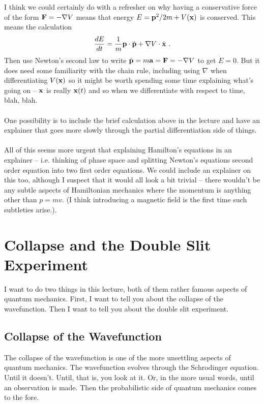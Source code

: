\documentclass[12pt]{article}
\def\be{\begin{eqnarray}}
\def\ee{\end{eqnarray}}
\newcommand\para{\paragraph{}}
\newcommand{\bx}{{\bf x}}
\begin{document}
{\color{blue}I think we could certainly do with a refresher on why having a conservative force of the form ${\bf F} = -\nabla V$ means that energy $E={\bf p}^2/2m + V(\bx)$ is conserved. This means the calculation 
%
\be \frac{dE}{dt} = \frac{1}{m} {\bf p}\cdot \dot{\bf p}+ \nabla V \cdot \dot{\bx}\ .\ee
%
Then use Newton's second law to write $\dot{\bf p} = m{\bf a} = {\bf F} = -\nabla V$ to get $\dot{E} = 0$. But it does need some familiarity with the chain rule, including using $\nabla$ when differentiating $V(\bx)$ so it might be worth spending some time explaining what's going on -- $\bx$ is really $\bx(t)$ and so when we differentiate with respect to time, blah, blah.

\para
One possibility is to include the brief calculation above in the lecture and have an explainer that goes more slowly through the partial differentiation side of things. 


\para
All of this seems more urgent that explaining Hamilton's equations  in an explainer -- i.e.  thinking of phase space and splitting Newton's equations second order equation into two first order equations. We could include an explainer on this too, although I suspect that it would all look a bit trivial -- there wouldn't be any subtle aspects of Hamiltonian mechanics where the momentum is anything other than $p=mv$. (I think introducing a magnetic field is the first time such subtleties arise.).}

\newpage
\section{Collapse and the Double Slit Experiment}

I want to do two things in this lecture, both of them rather famous aspects of quantum mechanics. First, I want to tell you about the collapse of the wavefunction. Then I want to tell you about the double slit experiment.


\subsection{Collapse of the Wavefunction}

The collapse of the wavefunction is one of the more unsettling aspects of quantum mechanics. The wavefunction evolves through the Schrodinger equation. Until it doesn't. Until, that is, you look at it. Or, in the more usual words, until an observation is made. Then the probabilistic side of quantum mechanics comes to the fore.
\end{document}
